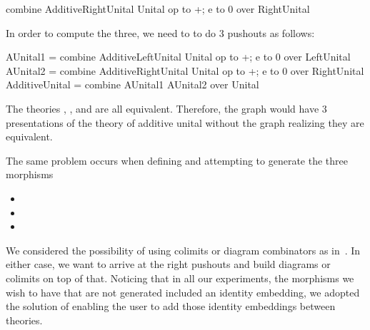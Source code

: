 \begin{togcode}
combine AdditiveRightUnital {} Unital {op to +; e to 0} 
over RightUnital 
\end{togcode}

In order to compute the three, we need to to do $3$ pushouts as follows:
\begin{togcode} 
AUnital1 = combine AdditiveLeftUnital {} Unital {op to +; e to 0} 
           over LeftUnital
AUnital2 = combine AdditiveRightUnital {} Unital {op to +; e to 0} 
           over RightUnital 
AdditiveUnital = combine AUnital1 {} AUnital2 {} over Unital 
\end{togcode} 
The theories , , and  are all equivalent. Therefore, the graph would have $3$ presentations of the theory of additive unital without the graph realizing they are equivalent. 

The same problem occurs when defining  and attempting to generate the three morphisms 
\begin{itemize}
    \item {}
    \item {}
    \item {}
\end{itemize}

We considered the possibility of using colimits or diagram combinators as in~\cite{cicm2019diagrams}. In either case, we want to arrive at the right pushouts and build diagrams or colimits on top of that. 
Noticing that in all our experiments, the morphisms we wish to have that are not generated included an identity embedding, we adopted the solution of enabling the user to add those identity embeddings between theories. %

